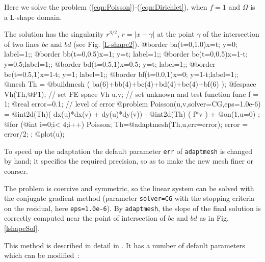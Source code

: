 \documentclass[a4paper,twoside,12pt]{book}
\begin{document}
Here we solve the problem (\ref{eqn:Poisson})-(\ref{eqn:Dirichlet}),
when $f=1$ and $\Omega$ is a L-shape domain.



\begin{example}
The solution has the
singularity $r^{3/2},\, r=|x-\gamma|$
at the point $\gamma$ of the intersection of two lines
$bc$ and $bd$ (see Fig. \ref{L-shape2}).
\bFF
@border ba(t=0,1.0){x=t;   y=0;  label=1;};
@border bb(t=0,0.5){x=1;   y=t;  label=1;};
@border bc(t=0,0.5){x=1-t; y=0.5;label=1;};
@border bd(t=0.5,1){x=0.5; y=t;  label=1;};
@border be(t=0.5,1){x=1-t; y=1;  label=1;};
@border bf(t=0.0,1){x=0;   y=1-t;label=1;};
@mesh Th = @buildmesh ( ba(6)+bb(4)+bc(4)+bd(4)+be(4)+bf(6) );
@fespace Vh(Th,@P1);  // set FE space
Vh u,v;             // set unknown and test function
func f = 1;
@real error=0.1;        // level of error
@problem Poisson(u,v,solver=CG,eps=1.0e-6) =
    @int2d(Th)(  dx(u)*dx(v) + dy(u)*dy(v))
  - @int2d(Th) ( f*v )
  + @on(1,u=0)  ;
@for (@int i=0;i< 4;i++)
{
  Poisson;
  Th=@adaptmesh(Th,u,err=error);
  error = error/2;
} ;
@plot(u);
\eFF
\end{example}
To speed up the adaptation
the default parameter \texttt{err} of
\texttt{adaptmesh} is changed by hand; it
specifies the required precision, so as to make the new mesh finer or coarser.

The problem is coercive and symmetric,
so the linear system can be solved with the conjugate gradient
method  (parameter \texttt{solver=CG}
with the stopping criteria on the residual, here
\texttt{eps=1.0e-6}).
By \texttt{adaptmesh}, the slope of the final solution is correctly computed near
the point of intersection of $bc$ and $bd$ as in Fig. \ref{lshapeSol}.

This method is described in detail in \cite{bamg}. It has a number of
default parameters which can be modified~:

\end{document}
